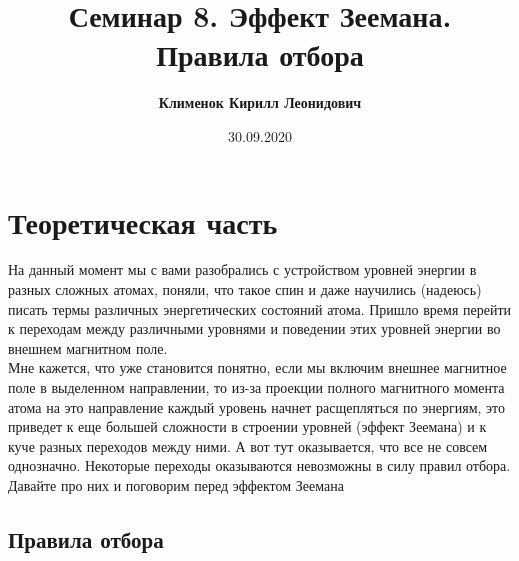 \documentclass[12pt]{article}
\begin{document}
 
\title{\textbf{Семинар 8. Эффект Зеемана. Правила отбора}}
\author{\textbf{Клименок Кирилл Леонидович}}
\date{30.09.2020}
\maketitle
\section{Теоретическая часть}
На данный момент мы с вами разобрались с устройством уровней энергии в разных сложных атомах, поняли, что такое спин и даже научились (надеюсь) писать термы различных энергетических состояний атома. Пришло время перейти к переходам между различными уровнями и поведении этих уровней энергии во внешнем магнитном поле.\\
Мне кажется, что уже становится понятно, если мы включим внешнее магнитное поле в выделенном направлении, то из-за проекции полного магнитного момента атома на это направление каждый уровень начнет расщепляться по энергиям, это приведет к еще большей сложности в строении уровней (эффект Зеемана) и к куче разных переходов между ними. А вот тут оказывается, что все не совсем однозначно. Некоторые переходы оказываются невозможны в силу правил отбора. Давайте про них и поговорим перед эффектом Зеемана
\subsection{Правила отбора}
\end{document}
